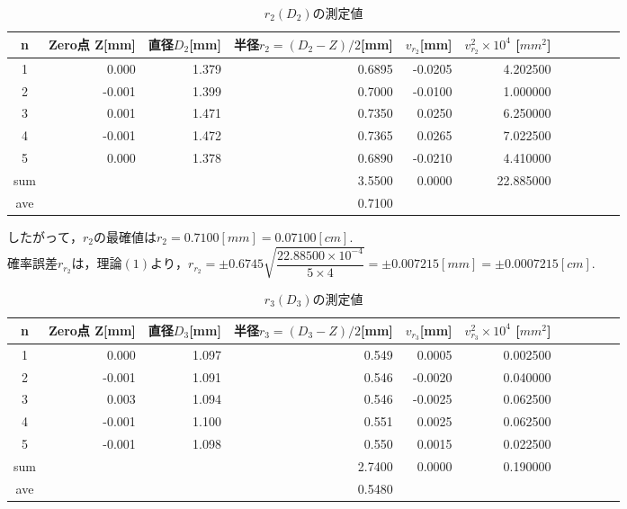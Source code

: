 \documentclass[a4paper,1pt]{jsarticle}
\begin{document}
\begin{table}[H]
  \caption{$r_2(D_2)$の測定値}
  \label{table:SpeedOfLight}
  \centering
  \begin{tabular}{|c||r|r|r|r|r|r|r|r|r|r|}
    \hline
    n & Zero点 Z[mm]& 直径$D_2 $[mm] & 半径$r_2=(D_2-Z)/2$[mm] & $v_{r_2}$[mm] & $v_{r_2}^2\times 10^4$ [$mm^2$] \\
    \hline\hline
    1 & 0.000 & 1.379 & 0.6895 & -0.0205 & 4.202500 \\
    2 & -0.001 & 1.399 & 0.7000 & -0.0100 & 1.000000 \\
    3 & 0.001 & 1.471 & 0.7350 & 0.0250 & 6.250000 \\
    4 & -0.001 & 1.472 & 0.7365 & 0.0265 & 7.022500 \\
    5 & 0.000 & 1.378 & 0.6890 & -0.0210 & 4.410000 \\
    

    \hline\hline
    sum & & & 3.5500 & 0.0000 & 22.885000 \\
    \hline
    ave & & & 0.7100 & &  \\

    \hline
  \end{tabular}


\end{table}

$したがって，r_2の最確値はr_2=0.7100[mm]=0.07100[cm].$\\

$確率誤差r_{r_2}は，理論(1)より，r_{r_2}=\pm0.6745\sqrt{\dfrac{22.88500\times10^{-4}}{5\times4}}=\pm0.007215[mm]=\pm0.0007215[cm].$

\begin{table}[H]
  \caption{$r_3(D_3)$の測定値}
  \label{table:SpeedOfLight}
  \centering
  \begin{tabular}{|c||r|r|r|r|r|r|r|r|r|r|}
    \hline
    n & Zero点 Z[mm]& 直径$D_3 $[mm] & 半径$r_3=(D_3-Z)/2$[mm] & $v_{r_3}$[mm] & $v_{r_3}^2\times 10^4$ [$mm^2$] \\
    \hline\hline
    1 & 0.000 & 1.097 & 0.549 & 0.0005 & 0.002500 \\
    2 & -0.001 & 1.091 & 0.546 & -0.0020 & 0.040000 \\
    3 & 0.003 & 1.094 & 0.546 & -0.0025 & 0.062500 \\
    4 & -0.001 & 1.100 & 0.551 & 0.0025 & 0.062500 \\
    5 & -0.001 & 1.098 & 0.550 & 0.0015 & 0.022500 \\

    \hline\hline
    sum & & & 2.7400 & 0.0000 & 0.190000 \\
    \hline
    ave & & & 0.5480 & &  \\

    \hline
  \end{tabular}


\end{table}
\end{document}
